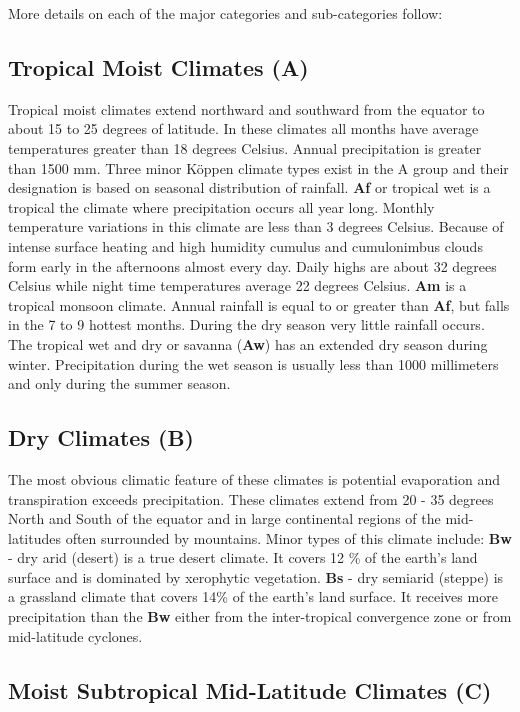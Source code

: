More details on each of the major categories and sub-categories follow:

\subsection{Tropical Moist Climates (A)}\label{tropical-moist-climates-a}

Tropical moist climates extend northward and southward from the equator to about 15 to 25 degrees of latitude. In these climates all months have average temperatures greater than 18 degrees Celsius. Annual precipitation is greater than 1500 mm. Three minor Köppen climate types exist in the A group and their designation is based on seasonal distribution of rainfall. \textbf{Af} or tropical wet is a tropical the climate where precipitation occurs all year long. Monthly temperature variations in this climate are less than 3 degrees Celsius. Because of intense surface heating and high humidity cumulus and cumulonimbus clouds form early in the afternoons almost every day. Daily highs are about 32 degrees Celsius while night time temperatures average 22 degrees Celsius. \textbf{Am} is a tropical monsoon climate. Annual rainfall is equal to or greater than \textbf{Af}, but falls in the 7 to 9 hottest months. During the dry season very little rainfall occurs. The tropical wet and dry or savanna (\textbf{Aw}) has an extended dry season during winter. Precipitation during the wet season is usually less than 1000 millimeters and only during the summer season.

\subsection{Dry Climates (B)}\label{dry-climates-b}

The most obvious climatic feature of these climates is potential evaporation and transpiration exceeds precipitation. These climates extend from 20 - 35 degrees North and South of the equator and in large continental regions of the mid-latitudes often surrounded by mountains. Minor types of this climate include: \textbf{Bw} - dry arid (desert) is a true desert climate. It covers 12 \% of the earth's land surface and is dominated by xerophytic vegetation. \textbf{Bs} - dry semiarid (steppe) is a grassland climate that covers 14\% of the earth's land surface. It receives more precipitation than the \textbf{Bw} either from the inter-tropical convergence zone or from mid-latitude cyclones.

\subsection{Moist Subtropical Mid-Latitude Climates (C)}\label{moist-subtropical-mid-latitude-climates-c}

